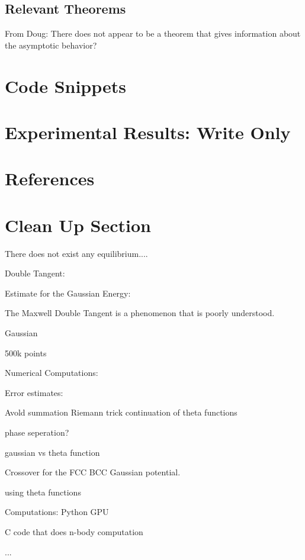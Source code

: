\documentclass[onecolumn,11pt,final]{amsart}
\begin{document}
\subsection{Relevant Theorems}

From Doug:  There does not appear to be a theorem that gives information about the asymptotic behavior?




\section{Code Snippets}



%






\section{Experimental Results: Write Only}





\section{References}





\section{Clean Up Section}

There does not exist any equilibrium....   

Double Tangent:


Estimate for the Gaussian Energy:  


The Maxwell Double Tangent is a phenomenon that is poorly understood.  


Gaussian

500k points

Numerical Computations:

Error estimates:   


Avold summation
Riemann trick continuation of theta functions

phase seperation?


gaussian vs theta function


Crossover for the FCC BCC Gaussian potential.   


using theta functions



Computations:  Python GPU

C code that does n-body computation










...
\end{document}
